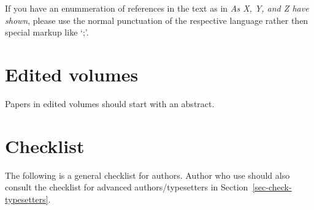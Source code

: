 
If you have an enummeration of references in the text as in \emph{As X, Y, and Z have shown}, please use
the normal punctuation of the respective language rather then special markup like `;'.

\noindent
{}


\section{Edited volumes}

Papers in edited volumes should start with an abstract.


\section{Checklist}

The following is a general checklist for authors. Author who use \latex should also consult the
checklist for advanced authors/typesetters in Section~\ref{sec-check-typesetters}.



















